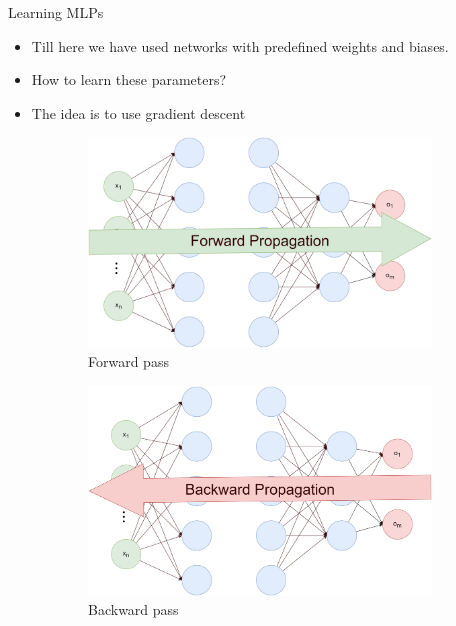 \documentclass[compress,oilve,t]{beamer}
\begin{document}
\begin{frame}{Learning MLPs}
	\begin{itemize}
		\item Till here we have used networks with predefined weights and biases.
		\item How to learn these parameters?
		\medskip
		\medskip
		\medskip
		\item The idea is to use gradient descent
	\end{itemize}
	\begin{figure}
		\centering
		\begin{subfigure}[b]{0.3\textwidth}
			\includegraphics[width=\textwidth]{Figs/forward_propagation.png}
			\caption{Forward pass}
		\end{subfigure}
		\begin{subfigure}[b]{0.3\textwidth}
			\includegraphics[width=\textwidth]{Figs/backward_propagation.png}
			\caption{Backward pass}
		\end{subfigure}
		\begin{subfigure}[b]{0.28\textwidth}

\end{subfigure}
\end{figure}
\end{frame}
\end{document}
